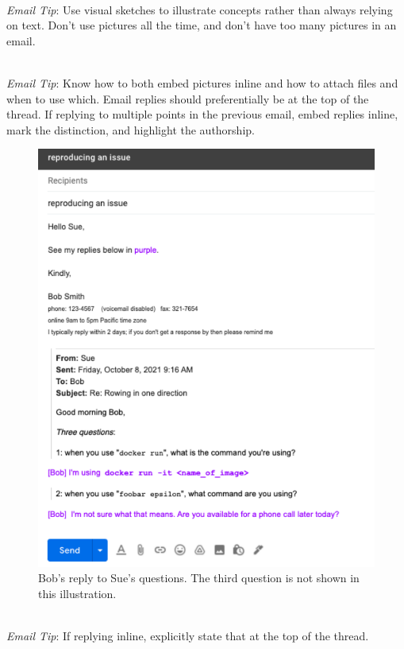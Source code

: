 \ \\
\textit{Email Tip}: Use visual sketches to illustrate concepts rather than always relying on text. Don't use pictures all the time, and don't have too many pictures in an email. 

\ \\
\textit{Email Tip}: Know how to both embed pictures inline and how to attach files and when to use which. 
Email replies should preferentially be at the top of the thread. 
If replying to multiple points in the previous email, embed replies inline, mark the distinction, and highlight the authorship. 

\begin{figure}
\includegraphics[width=1\textwidth]{images/email_reply.pdf}
\caption{Bob's reply to Sue's questions. The third question is not shown in this illustration.}
\label{fig:email_reply}
\end{figure}

\ \\
\textit{Email Tip}: If replying inline, explicitly state that at the top of the thread.

